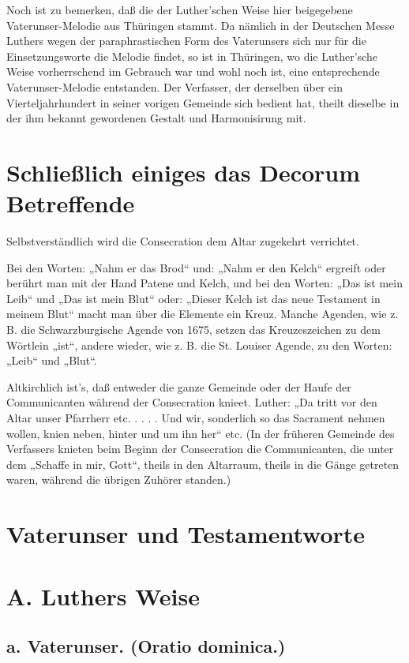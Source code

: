 Noch ist zu bemerken, daß die der Luther’schen Weise hier beigegebene Vaterunser-Melodie aus Thüringen stammt. Da nämlich in der Deutschen Messe Luthers wegen der paraphrastischen Form des Vaterunsers sich nur für die Einsetzungsworte die Melodie findet, so ist in Thüringen, wo die Luther’sche Weise vorherrschend im Gebrauch war und wohl noch ist, eine entsprechende Vaterunser-Melodie entstanden. Der Verfasser, der derselben über ein Vierteljahrhundert in seiner vorigen Gemeinde sich bedient hat, theilt dieselbe in der ihm bekannt gewordenen Gestalt und Harmonisirung mit.

\section[das Decorum Betreffende]{Schließlich einiges das Decorum Betreffende}

Selbstverständlich wird die Consecration dem Altar zugekehrt verrichtet.

Bei den Worten: „Nahm er das Brod“ und: „Nahm er den Kelch“ ergreift oder berührt man mit der Hand Patene und Kelch, und bei den Worten: „Das ist mein Leib“ und „Das ist mein Blut“ oder: „Dieser Kelch ist das neue Testament in meinem Blut“ macht man über die Elemente ein Kreuz. Manche Agenden, wie z. B. die Schwarzburgische Agende von 1675, setzen das Kreuzeszeichen zu dem Wörtlein
„ist“, andere wieder, wie z. B. die St. Louiser Agende, zu den Worten: „Leib“ und „Blut“.

Altkirchlich ist’s, daß entweder die ganze Gemeinde oder der Haufe der Communicanten während der Consecration knieet. Luther: „Da tritt vor den Altar unser Pfarrherr etc. . . . . Und wir, sonderlich so das Sacrament nehmen wollen, knien neben, hinter und um ihn her“ etc. (In der früheren Gemeinde des Verfassers knieten beim Beginn der Consecration die Communicanten, die unter dem „Schaffe in mir, Gott“, theils in den Altarraum, theils in die Gänge getreten waren, während die übrigen Zuhörer standen.)

\section{Vaterunser und Testamentworte}

\section{A. Luthers Weise}

\subsection{a. Vaterunser. (Oratio dominica.)}

